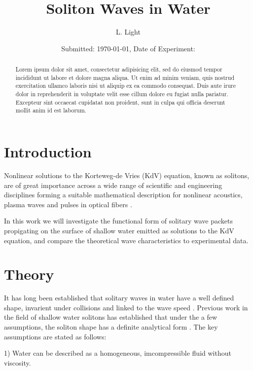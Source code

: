 \documentclass[10pt, twocolumn]{revtex4}    %
\begin{document}
\title{Soliton Waves in Water}
\date{Submitted: \today{}, Date of Experiment: }
\author{L. Light}

\begin{abstract}
Lorem ipsum dolor sit amet, consectetur adipisicing elit, sed do eiusmod tempor incididunt ut labore et dolore magna aliqua. Ut enim ad minim veniam, quis nostrud exercitation ullamco laboris nisi ut aliquip ex ea commodo consequat. Duis aute irure dolor in reprehenderit in voluptate velit esse cillum dolore eu fugiat nulla pariatur. Excepteur sint occaecat cupidatat non proident, sunt in culpa qui officia deserunt mollit anim id est laborum.
\end{abstract}

\maketitle
\thispagestyle{plain} %



\section{Introduction}
Nonlinear solutions to the Korteweg-de Vries (KdV) equation, known as solitons, are of great importance across a wide range of scientific and engineering disciplines forming a suitable mathematical description for nonlinear acoustics, plasma waves and pulses in optical fibers \cite{falcon}.

In this work we will investigate the functional form of solitary wave packets propigating on the surface of shallow water emitted as solutions to the KdV equation, and compare the theoretical wave characteristics to experimental data.

\section{Theory}
It has long been established that solitary waves in water have a well defined shape, invarient under collisions and linked to the wave speed \cite{russell}.
Previous work in the field of shallow water solitons has established that under the a few assumptions, the soliton shape has a definite analytical form \cite{bettini}.
The key assumptions are stated as follows:

1) Water can be described as a homogeneous, imcompressible fluid without viscosity.
\end{document}

